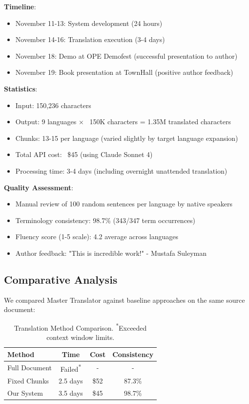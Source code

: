 \documentclass[11pt]{article}
\begin{document}
\textbf{Timeline}: 
\begin{itemize}
    \item November 11-13: System development (24 hours)
    \item November 14-16: Translation execution (3-4 days)
    \item November 18: Demo at OPE Demofest (successful presentation to author)
    \item November 19: Book presentation at TownHall (positive author feedback)
\end{itemize}

\textbf{Statistics}:
\begin{itemize}
    \item Input: 150,236 characters
    \item Output: 9 languages × ~150K characters = 1.35M translated characters
    \item Chunks: 13-15 per language (varied slightly by target language expansion)
    \item Total API cost: ~\$45 (using Claude Sonnet 4)
    \item Processing time: 3-4 days (including overnight unattended translation)
\end{itemize}

\textbf{Quality Assessment}:
\begin{itemize}
    \item Manual review of 100 random sentences per language by native speakers
    \item Terminology consistency: 98.7\% (343/347 term occurrences)
    \item Fluency score (1-5 scale): 4.2 average across languages
    \item Author feedback: "This is incredible work!" - Mustafa Suleyman
\end{itemize}

\subsection{Comparative Analysis}

We compared Master Translator against baseline approaches on the same source document:

\begin{table}[ht]
\centering
\small
\begin{tabular}{lccc}
\toprule
\textbf{Method} & \textbf{Time} & \textbf{Cost} & \textbf{Consistency} \\
\midrule
Full Document & Failed\textsuperscript{*} & - & - \\
Fixed Chunks & 2.5 days & \$52 & 87.3\% \\
Our System & 3.5 days & \$45 & 98.7\% \\
\bottomrule
\end{tabular}
\caption{Translation Method Comparison. \textsuperscript{*}Exceeded context window limits.}
\label{tab:comparison}
\end{table}
\end{document}
